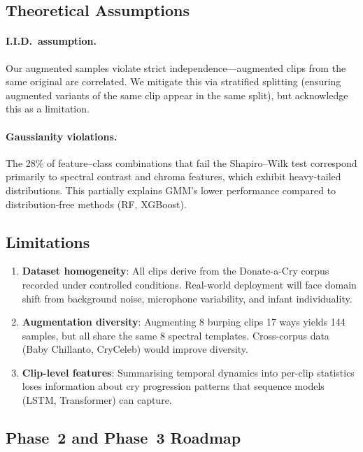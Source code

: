 \documentclass[11pt,a4paper]{article}
\begin{document}
\subsection{Theoretical Assumptions}

\paragraph{I.I.D.\ assumption.}
Our augmented samples violate strict independence---augmented clips
from the same original are correlated. We mitigate this via stratified
splitting (ensuring augmented variants of the same clip appear in the
same split), but acknowledge this as a limitation.

\paragraph{Gaussianity violations.}
The 28\% of feature--class combinations that fail the Shapiro--Wilk
test correspond primarily to spectral contrast and chroma features,
which exhibit heavy-tailed distributions. This partially explains
GMM's lower performance compared to distribution-free methods (RF,
XGBoost).

\subsection{Limitations}

\begin{enumerate}[nosep]
  \item \textbf{Dataset homogeneity}: All clips derive from the
        Donate-a-Cry corpus recorded under controlled conditions.
        Real-world deployment will face domain shift from background
        noise, microphone variability, and infant individuality.
  \item \textbf{Augmentation diversity}: Augmenting 8 burping clips
        17 ways yields 144 samples, but all share the same 8 spectral
        templates. Cross-corpus data (Baby Chillanto, CryCeleb) would
        improve diversity.
  \item \textbf{Clip-level features}: Summarising temporal dynamics
        into per-clip statistics loses information about cry
        progression patterns that sequence models (LSTM, Transformer)
        can capture.
\end{enumerate}

\subsection{Phase~2 and Phase~3 Roadmap}
\end{document}
